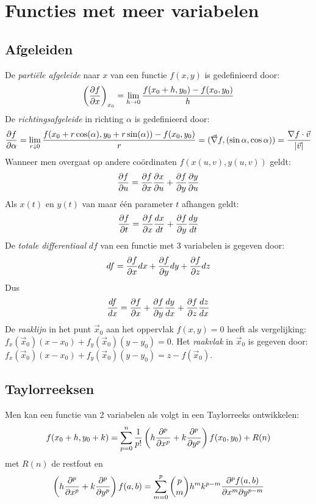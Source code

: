 \section{Functies met meer variabelen}
\subsection{Afgeleiden}
De {\it parti\"ele afgeleide} naar $x$ van een functie $f(x,y)$ is gedefinieerd
door:
\[
\left(\frac{\partial f}{\partial x}\right)_{x_0}=\lim_{h\rightarrow0}\frac{f(x_0+h,y_0)-f(x_0,y_0)}{h}
\]
De {\it richtingsafgeleide} in richting $\alpha$ is gedefinieerd door:
\[
\frac{\partial f}{\partial \alpha}=\lim_{r\downarrow0}\frac{f(x_0+r\cos(\alpha),y_0+r\sin(\alpha))-f(x_0,y_0)}{r}=
(\vec{\nabla}f,(\sin\alpha,\cos\alpha))=\frac{\nabla f\cdot\vec{v}}{|\vec{v}|}
\]
Wanneer men overgaat op andere co\"ordinaten $f(x(u,v),y(u,v))$ geldt:
\[
\frac{\partial f}{\partial u}=\frac{\partial f}{\partial x}\frac{\partial x}{\partial u}+\frac{\partial f}{\partial y}\frac{\partial y}{\partial u}
\]
Als $x(t)$ en $y(t)$ van maar \'e\'en parameter $t$ afhangen geldt:
\[
\frac{\partial f}{\partial t}=\frac{\partial f}{\partial x}\frac{dx}{dt}+\frac{\partial f}{\partial y}\frac{dy}{dt}
\]
De {\it totale differentiaal} $df$ van een functie met 3 variabelen is
gegeven door:
\[
df=\frac{\partial f}{\partial x}dx+\frac{\partial f}{\partial y}dy+\frac{\partial f}{\partial z}dz
\]
Dus
\[
\frac{df}{dx}=\frac{\partial f}{\partial x}+\frac{\partial f}{\partial y}\frac{dy}{dx}+\frac{\partial f}{\partial z}\frac{dz}{dx}
\]
De {\it raaklijn} in het punt $\vec{x}_0$ aan het oppervlak $f(x,y)=0$ heeft
als vergelijking:\\ $f_x(\vec{x}_0)(x-x_0)+f_y(\vec{x}_0)(y-y_0)=0$.
\npar
Het {\it raakvlak} in $\vec{x}_0$ is gegeven door:
$f_x(\vec{x}_0)(x-x_0)+f_y(\vec{x}_0)(y-y_0)=z-f(\vec{x}_0)$.

\subsection{Taylorreeksen}
Men kan een functie van 2 variabelen als volgt in een Taylorreeks ontwikkelen:
\[
f(x_0+h,y_0+k)=\sum\limits_{p=0}^n \frac{1}{p!}
\left(h\frac{\partial ^p}{\partial x^p}+k\frac{\partial ^p}{\partial y^p}\right)f(x_0,y_0)+R(n)
\]
met $R(n)$ de restfout en
\[
\left(h\frac{\partial ^p}{\partial x^p}+k\frac{\partial ^p}{\partial y^p}\right)f(a,b)=\sum\limits_{m=0}^p{p\choose m}
h^mk^{p-m}\frac{\partial^pf(a,b)}{\partial x^m\partial y^{p-m}}
\]

